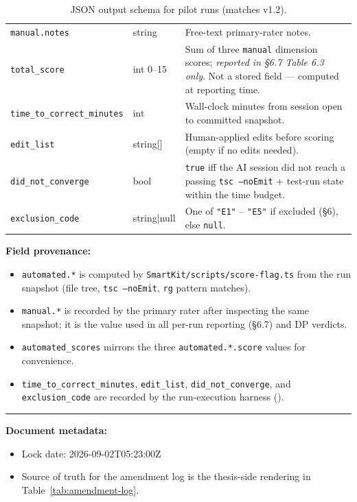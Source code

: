 \begin{table}[H]
\begin{tabular}{lp{4cm}p{7cm}}
\texttt{manual.notes} & string & Free-text primary-rater notes. \\
\texttt{total\_score} & int 0--15 & Sum of three \texttt{manual} dimension scores; \emph{reported in §6.7 Table 6.3 only}. Not a stored field — computed at reporting time. \\
\texttt{time\_to\_correct\_minutes} & int & Wall-clock minutes from session open to committed snapshot. \\
\texttt{edit\_list} & string[] & Human-applied edits before scoring (empty if no edits needed). \\
\texttt{did\_not\_converge} & bool & \texttt{true} iff the AI session did not reach a passing \texttt{tsc --noEmit} + test-run state within the time budget. \\
\texttt{exclusion\_code} & string|null & One of \texttt{"E1"} -- \texttt{"E5"} if excluded (\S6), else \texttt{null}. \\
\bottomrule
\end{tabular}
\caption{JSON output schema for pilot runs (matches  v1.2).}
\label{tab:json-schema}
\end{table}

\textbf{Field provenance:}
\begin{itemize}
\item \texttt{automated.*} is computed by \texttt{SmartKit/scripts/score-flag.ts} from the run snapshot (file tree, \texttt{tsc --noEmit}, \texttt{rg} pattern matches).
\item \texttt{manual.*} is recorded by the primary rater after inspecting the same snapshot; it is the value used in all per-run reporting (\S6.7) and DP verdicts.
\item \texttt{automated\_scores} mirrors the three \texttt{automated.*.score} values for convenience.
\item \texttt{time\_to\_correct\_minutes}, \texttt{edit\_list}, \texttt{did\_not\_converge}, and \texttt{exclusion\_code} are recorded by the run-execution harness ().
\end{itemize}


\vspace{2em}
\noindent\rule{\textwidth}{0.4pt}

\textbf{Document metadata:}
\begin{itemize}
\item Lock date: 2026-09-02T05:23:00Z
\item Source of truth for the amendment log is the thesis-side rendering in Table~\ref{tab:amendment-log}.
\end{itemize}